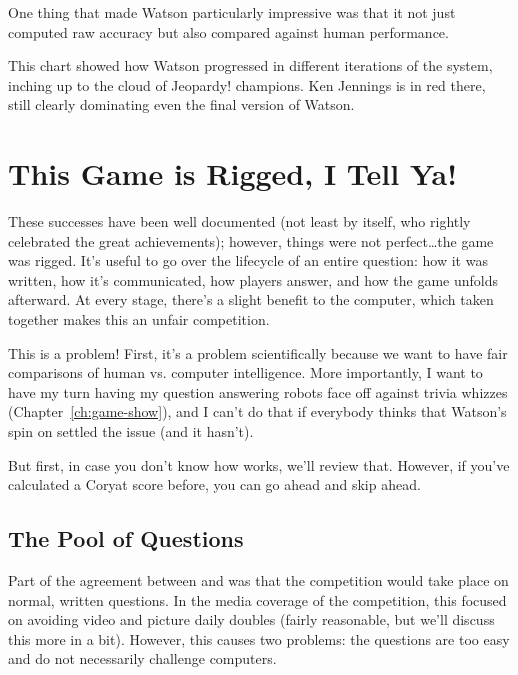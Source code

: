 One thing that made Watson particularly impressive was that it not just computed raw accuracy but also compared against human performance.  

This chart showed how Watson progressed in different iterations of the system, inching up to the cloud of Jeopardy! champions.  Ken Jennings is in red there, still clearly dominating even the final version of Watson.

\section{This Game is Rigged, I Tell Ya!}

These successes have been well documented (not least by 
itself, who rightly celebrated the great achievements); however,
things were not perfect\dots the game was rigged.
%
It's useful to go over the lifecycle of an entire question: how it was
written, how it's communicated, how players answer, and how the game
unfolds afterward.
%
At every stage, there's a slight benefit to the computer, which taken
together makes this an unfair competition.

This is a problem!  First, it's a problem scientifically because we
want to have fair comparisons of human vs. computer intelligence.
%
More importantly, I want to have my turn having my question answering
robots face off against trivia whizzes (Chapter~\ref{ch:game-show}),
and I can't do that if everybody thinks that Watson's spin
on \jeopardy{} settled the issue (and it hasn't).


But first, in case you don't know how \jeopardy{} works, we'll review
that.
%
However, if you've calculated a Coryat score before, you can go ahead
and skip ahead.


\subsection{The Pool of Questions}


Part of the agreement between \jeopardy{} and  was that the
competition would take place on normal, written questions.
%
In the media coverage of the competition, this focused on avoiding
video and picture daily doubles (fairly reasonable, but we'll discuss
this more in a bit).
%
However, this causes two problems: the questions are too easy and do
not necessarily challenge computers.

